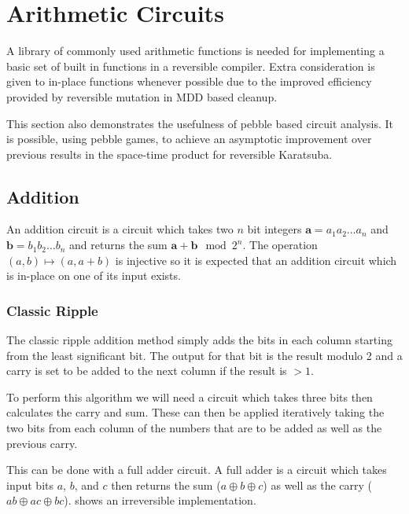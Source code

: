 \chapter{Arithmetic Circuits}

A library of commonly used arithmetic functions is needed for implementing a
basic set of built in functions in a reversible compiler.  Extra consideration
is given to in-place functions whenever possible due to the improved efficiency
provided by reversible mutation in MDD based cleanup.

This section also demonstrates the usefulness of pebble based circuit analysis.
It is possible, using pebble games, to achieve an asymptotic improvement over
previous results in the space-time product for reversible Karatsuba.

\section{Addition}

  An addition circuit is a circuit which takes two $n$ bit integers $\mathbf{a} =
  a_1a_2\dotsc a_n$ and $\mathbf{b} = b_1b_2\dotsc b_n$ and returns the sum
  $\mathbf{a}+\mathbf{b}\mod 2^n$. The operation $(a,b)\mapsto (a,a+b)$ is injective so
  it is expected that an addition circuit which is in-place on one of its input exists.

  \subsection{Classic Ripple}

    The classic ripple addition method simply adds the bits in each column
    starting from the least significant bit.  The output for that bit is the
    result modulo 2 and a carry is set to be added to the next column if the
    result is $>1$.

    To perform this algorithm we will need a circuit which takes three bits then
    calculates the carry and sum.  These can then be applied iteratively taking
    the two bits from each column of the numbers that are to be added as well as
    the previous carry.

    This can be done with a full adder circuit.  A full adder is a circuit
    which takes input bits $a$, $b$, and $c$ then returns the sum ($a \oplus b
    \oplus c$) as well as the carry ($ab\oplus ac \oplus bc$).
     shows an irreversible implementation.


